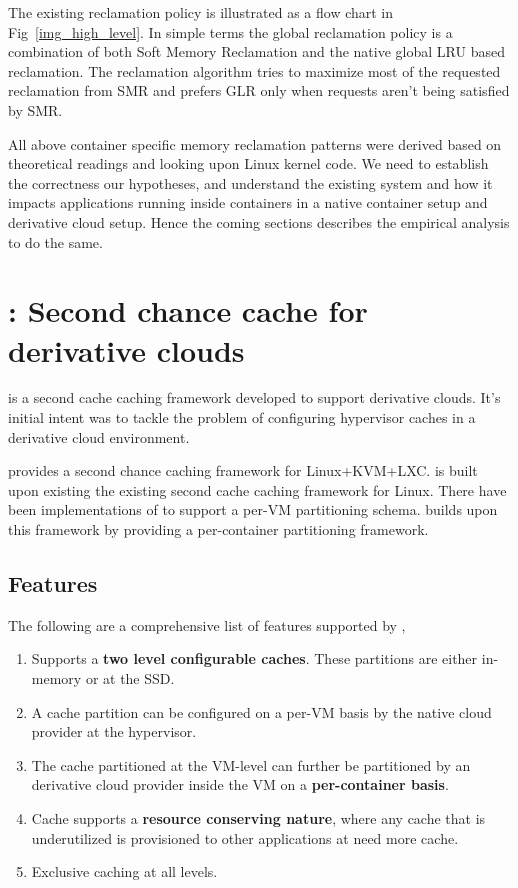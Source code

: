      The existing reclamation policy is illustrated as a flow chart in Fig~\ref{img_high_level}. In simple terms the global reclamation 
policy is a combination of both Soft Memory Reclamation and the native global LRU based reclamation. The reclamation algorithm tries to 
maximize most of the requested reclamation from SMR and prefers GLR only when requests aren't being satisfied by SMR.

      All above container specific memory reclamation patterns were derived based on theoretical readings and looking upon Linux kernel 
code. We need to establish the correctness our hypotheses, and understand the existing system and how it impacts applications running 
inside containers in a native container setup and derivative cloud setup. Hence the coming sections describes the empirical analysis to 
do the same.
      
  
  \section{\dd{}: Second chance cache for derivative clouds}
  
    \dd{}\cite{doubledecker} is a second cache caching framework developed to support derivative clouds. It's initial intent was to tackle the
    problem of configuring hypervisor caches in a derivative cloud environment. 
    
    \dd{} provides a second chance caching framework for Linux+KVM+LXC.
    \dd{} is built upon existing the existing \tmem{} second cache caching framework for Linux. There have been implementations\cite{venkatesan2014ex} of \tmem{} 
    to support a per-VM partitioning schema. \dd{} builds upon this framework by providing a per-container partitioning framework.
    
    
    \subsection{Features}
    
    \noindent The following are a comprehensive list of features supported by \dd{},
      \begin{enumerate}
	\item Supports a \textbf{two level configurable caches}. These partitions are either in-memory or at the SSD. 
	\item A cache partition can be configured on a per-VM basis by the native cloud provider at the hypervisor.
	\item The cache partitioned at the VM-level can further be partitioned by an derivative cloud provider inside the VM on a \textbf{per-container basis}.
	\item Cache supports a \textbf{resource conserving nature}, where any cache that is underutilized is provisioned to other applications at need
	more cache.
	\item Exclusive caching at all levels.
      \end{enumerate}
      
